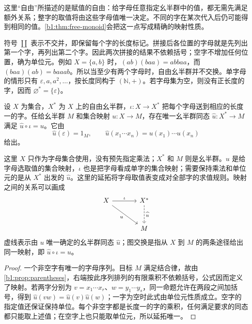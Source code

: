 
这里“自由”所描述的是赋值的自由：给字母任意指定幺半群中的值，都无需先满足额外关系；整字的取值将由这些字母值唯一决定。不同的字在某次代入后仍可能得到相同的值。\cref{b1:thm:free-monoid}会把这一点写成精确的映射性质。

\ProseParagraphBreak
符号 \(\coprod\) 表示不交并，即保留每个字的长度标记。拼接后各位置的字母就是先列出第一个字，再列出第二个字。因此两次拼接的结果不依赖括号；空字不增加任何位置，确为单位元。例如 \(X=\{a,b\}\) 时，\((ab)(baa)=abbaa\)，而 \((baa)(ab)=baaab\)。所以当至少有两个字母时，自由幺半群并不交换。单字母的情形只有 \(\varepsilon,a,a^2,\ldots\)，按长度同构于 \((\mathbb N,+)\)。若字母集为空，则没有正长度的字，因而 \(\varnothing^*=\{\varepsilon\}\)。

\begin{theorem}[字母映射的延拓]\label{b1:thm:free-monoid}
	设 \(X\) 为集合，\(X^*\) 为 \(X\) 上的自由幺半群，\(\iota:X\rightarrow X^*\) 把每个字母送到相应的长度一的字。任给幺半群 \(M\) 和集合映射 \(u:X\rightarrow M\)，存在唯一幺半群同态 \(\widehat u:X^*\rightarrow M\) 满足 \(\widehat u\circ\iota=u\)。它由
	\[
		\widehat u(\varepsilon)=1_M,\qquad \widehat u(x_1\cdots x_n)=u(x_1)\cdots u(x_n)
	\]
	给出。
\end{theorem}

\begin{samepage}
	这里 \(X\) 只作为字母集合使用，没有预先指定乘法；\(X^*\) 和 \(M\) 则是幺半群。\(u\) 是给字母选取值的集合映射，\(\iota\) 也是把字母看成单字的集合映射；需要保持乘法和单位元的是从 \(X^*\) 出发的 \(\widehat u\)。这里的延拓将字母取值表变成对全部字的求值规则。映射之间的关系可以画成
	\[
		\begin{tikzcd}[row sep=large, column sep=large]
			X \arrow[r, "\iota"] \arrow[dr, "u"'] & X^* \arrow[d, dashed, "\widehat u"] \\
			& M
		\end{tikzcd}
	\]
	虚线表示由 \(u\) 唯一确定的幺半群同态 \(\widehat u\)；图交换是指从 \(X\) 到 \(M\) 的两条途径给出同一映射，即 \(\widehat u\circ\iota=u\)。
\end{samepage}

\begin{proof}
	一个非空字有唯一的字母序列。目标 \(M\) 满足结合律，故由\cref{b1:prop:parentheses}，右端按此序列排列的有限乘积不依赖括号，公式因而定义了映射。若两字分别为 \(v=x_1\cdots x_r\)、\(w=y_1\cdots y_s\)，同一命题允许在两段之间加括号，得到 \(\widehat u(vw)=\widehat u(v)\widehat u(w)\)；一字为空时此式由单位元性质成立。空字的指定值还保证保持单位。每个非空字都是长度一的字的乘积，任何满足要求的同态都只能取上述值；在空字上也只能取单位元，所以延拓唯一。
\end{proof}

